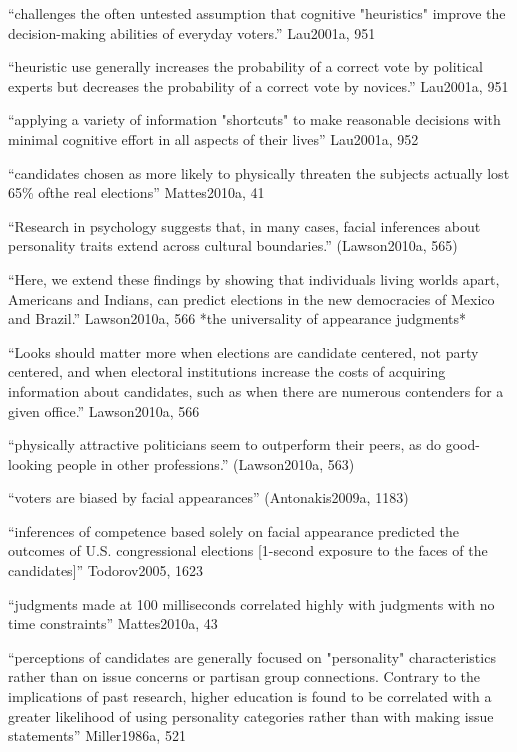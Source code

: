 ``challenges the often untested assumption that cognitive "heuristics" improve the decision-making abilities of everyday voters.'' Lau2001a, 951

``heuristic use generally increases the probability of a correct vote by political experts but decreases the probability of a correct vote by novices.'' Lau2001a, 951

``applying a variety of information "shortcuts" to make reasonable decisions with minimal cognitive effort in all aspects of their lives'' Lau2001a, 952


``candidates chosen as more likely to physically threaten the subjects actually lost 65\% ofthe real elections'' Mattes2010a, 41

``Research in psychology suggests that, in many cases, facial inferences about personality traits extend across cultural boundaries.'' (Lawson2010a, 565)

``Here, we extend these findings by showing that individuals living worlds apart, Americans and Indians, can predict elections in the new democracies of Mexico and Brazil.'' Lawson2010a, 566 *the universality of appearance judgments*

``Looks should matter more when elections are candidate centered, not party centered, and when electoral institutions increase the costs of acquiring information about candidates, such as when there are numerous contenders for a given office.'' Lawson2010a, 566

``physically attractive politicians seem to outperform their peers, as do good-looking people in other professions.'' (Lawson2010a, 563)

``voters are biased by facial appearances'' (Antonakis2009a, 1183)


	
	``inferences of competence based solely on facial appearance predicted the outcomes of U.S. congressional elections [1-second exposure to the faces of the candidates]'' Todorov2005, 1623

	``judgments made at 100 milliseconds correlated highly with judgments with no time constraints'' Mattes2010a, 43

``perceptions of candidates are generally focused on "personality" characteristics rather than on issue concerns or partisan group connections. Contrary to the implications of past research, higher education is found to be correlated with a greater likelihood of using personality categories rather than with making issue statements'' Miller1986a, 521

